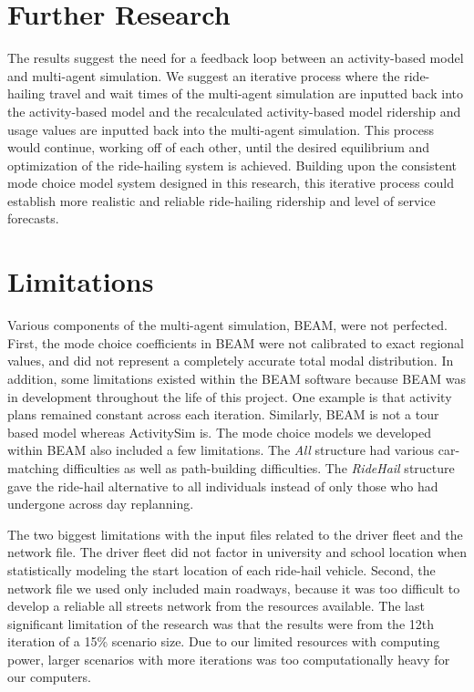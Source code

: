 \documentclass[fancy, masters]{byuthesis}
\begin{document}
\hypertarget{further-research}{%
\section{Further Research}\label{further-research}}

The results suggest the need for a feedback loop between an activity-based model and multi-agent simulation. We suggest an iterative process where the ride-hailing travel and wait times of the multi-agent simulation are inputted back into the activity-based model and the recalculated activity-based model ridership and usage values are inputted back into the multi-agent simulation. This process would continue, working off of each other, until the desired equilibrium and optimization of the ride-hailing system is achieved. Building upon the consistent mode choice model system designed in this research, this iterative process could establish more realistic and reliable ride-hailing ridership and level of service forecasts.

\hypertarget{limitations}{%
\section{Limitations}\label{limitations}}

Various components of the multi-agent simulation, BEAM, were not perfected. First, the mode choice coefficients in BEAM were not calibrated to exact regional values, and did not represent a completely accurate total modal distribution. In addition, some limitations existed within the BEAM software because BEAM was in development throughout the life of this project. One example is that activity plans remained constant across each iteration. Similarly, BEAM is not a tour based model whereas ActivitySim is. The mode choice models we developed within BEAM also included a few limitations. The \emph{All} structure had various car-matching difficulties as well as path-building difficulties. The \emph{RideHail} structure gave the ride-hail alternative to all individuals instead of only those who had undergone across day replanning.

The two biggest limitations with the input files related to the driver fleet and the network file. The driver fleet did not factor in university and school location when statistically modeling the start location of each ride-hail vehicle. Second, the network file we used only included main roadways, because it was too difficult to develop a reliable all streets network from the resources available. The last significant limitation of the research was that the results were from the 12th iteration of a 15\% scenario size. Due to our limited resources with computing power, larger scenarios with more iterations was too computationally heavy for our computers.
\end{document}
